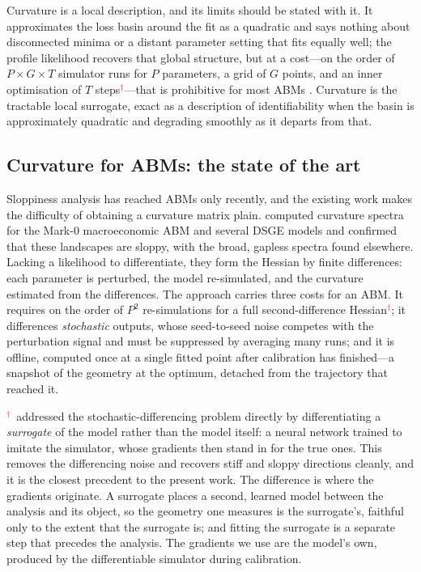 \documentclass[10pt,twocolumn]{article}
\newcommand{\vc}{\textcolor{red}{$^{\dagger}$}}
\begin{document}
Curvature is a local description, and its limits should be stated with it. It
approximates the loss basin around the fit as a quadratic and says nothing about
disconnected minima or a distant parameter setting that fits equally well; the
profile likelihood recovers that global structure, but at a cost---on the order of
$P \times G \times T$ simulator runs for $P$ parameters, a grid of $G$ points, and
an inner optimisation of $T$ steps\vc---that is prohibitive for most ABMs
\citep{raue2009structural}. Curvature is the tractable local surrogate, exact as a
description of identifiability when the basin is approximately quadratic and
degrading smoothly as it departs from that.

\subsection{Curvature for ABMs: the state of the art}
\label{sec:bg:sota}

Sloppiness analysis has reached ABMs only recently, and the existing work makes the
difficulty of obtaining a curvature matrix plain. \citet{naumann2024exploration}
computed curvature spectra for the Mark-0 macroeconomic ABM and several DSGE models
and confirmed that these landscapes are sloppy, with the broad, gapless spectra
found elsewhere. Lacking a likelihood to differentiate, they form the Hessian by
finite differences: each parameter is perturbed, the model re-simulated, and the
curvature estimated from the differences. The approach carries three costs for an
ABM. It requires on the order of $P^2$ re-simulations for a full
second-difference Hessian\vc; it differences \emph{stochastic} outputs, whose
seed-to-seed noise competes with the perturbation signal and must be suppressed by
averaging many runs; and it is offline, computed once at a single fitted point after
calibration has finished---a snapshot of the geometry at the optimum, detached from
the trajectory that reached it.

\citet{scarrold2024computing}\vc\ addressed the stochastic-differencing problem
directly by differentiating a \emph{surrogate} of the model rather than the model
itself: a neural network trained to imitate the simulator, whose gradients then
stand in for the true ones. This removes the differencing noise and recovers stiff
and sloppy directions cleanly, and it is the closest precedent to the present work.
The difference is where the gradients originate. A surrogate places a second,
learned model between the analysis and its object, so the geometry one measures is
the surrogate's, faithful only to the extent that the surrogate is; and fitting the
surrogate is a separate step that precedes the analysis. The gradients we use are
the model's own, produced by the differentiable simulator during calibration.
\end{document}
